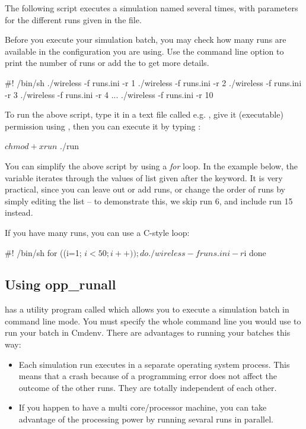 The following script executes a simulation named 
several times, with parameters for the different runs
given in the  file.

Before you execute your simulation batch, you may check how many
runs are available in the configuration you are using. Use the
 command line option to print the number of runs or
add the  to get more details.

\begin{filelisting}
#! /bin/sh
./wireless -f runs.ini -r 1
./wireless -f runs.ini -r 2
./wireless -f runs.ini -r 3
./wireless -f runs.ini -r 4
...
./wireless -f runs.ini -r 10
\end{filelisting}

To run the above script, type it in a text file called e.g. ,
give it  (executable) permission using ,
then you can execute it by typing :

\begin{commandline}
$ chmod +x run
$ ./run
\end{commandline}

You can simplify the above script by using a \textit{for} loop.
In the example below, the variable  iterates through
the values of list given after the  keyword.
It is very practical, since you can leave out or add runs,
or change the order of runs by simply editing the list --
to demonstrate this, we skip run 6, and include run 15 instead.


If you have many runs, you can use a C-style loop:

\begin{filelisting}
#! /bin/sh
for ((i=1; $i<50; i++)); do
   ./wireless -f runs.ini -r $i
done
\end{filelisting}

\subsection{Using opp\_runall}

{\opp} has a utility program called  which
allows you to execute a simulation batch in command line mode.
You must specify the whole command line you would use to run
your batch in Cmdenv. There are advantages to running your batches
this way:
\begin{itemize}
  \item Each simulation run executes in a separate operating system process.
        This means that a crash because of a programming error does not affect
        the outcome of the other runs. They are totally independent of each other.
  \item If you happen to have a multi core/processor machine, you can take advantage
        of the processing power by running sevaral runs in parallel.
\end{itemize}

